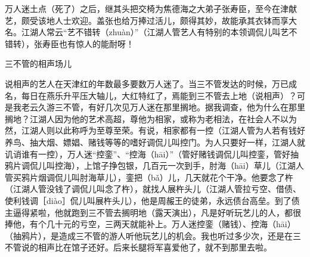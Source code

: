 \documentclass[12pt,UTF8]{ctexbook}
\begin{document}
万人迷土点（死了）之后，继其头把交椅为焦德海之大弟子张寿臣，至今在津献艺，颇受该地人士欢迎。盖张也给万捧过活儿，颇得其妙，故能承其衣钵而享大名。江湖人常云“艺不错转（zhuàn）”（江湖人管艺人有特别的本领调侃儿叫艺不错转），张寿臣也有惊人的能耐呀！





三不管的相声场儿


说相声的艺人在天津红的年数最多要数万人迷了。当三不管发达的时候，万已成名，每日在燕乐升平压大轴儿，大红特红了，焉能到三不管去上地（说相声）？可是我老云久游三不管，有好几次见万人迷在那里搁地。据我调查，他为什么在那里搁地？江湖人因为他的艺术高超，尊他为相家，或称为老相法，在社会人不以为然，江湖人则以此称呼为至尊至荣。有说，相家都有一控（江湖人管为人若有钱好养鸟、抽大烟、嫖娼、赌钱等等的嗜好调侃儿叫控门。为人只要好一样，江湖人就讥诮谁有一控），万人迷“控銮”、“控海（hāi）”（管好赌钱调侃儿叫控銮，管好抽鸦片调侃儿叫控海），上馆子挣包银，几百元一次到手，肘海（hāi）草儿（江湖人管买鸦片烟调侃儿叫肘海草儿），銮把（bǎ）儿，几天就花个干净。他要念了杵（江湖人管没钱了调侃儿叫念了杵），就找人展杵头儿（江湖人管拉亏空、借债、使利钱调［diào］侃儿叫展杵头儿），他是周赧王的徒弟，永远债台高垒。到了债主逼得紧啦，他就跑到三不管去搁明地（露天演出），凡是好听玩艺儿的人，都很捧他，有个几十元的亏空，三两天就能补上。万人迷控銮（赌钱）、控海（hāi）（抽鸦片），是造成三不管的游人听他玩艺儿的机会。我也听过多少次，还是在三不管说的相声比在馆子还好。后来长腿将军喜爱他了，就不到那里去啦。
\end{document}
